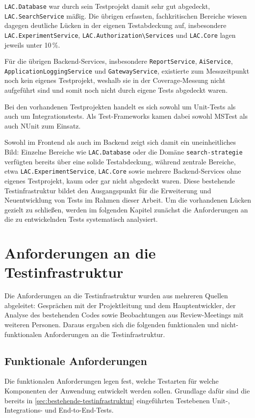 \texttt{LAC.Database} war durch sein Testprojekt damit sehr gut abgedeckt, \texttt{LAC.SearchService} mäßig. Die übrigen erfassten, fachkritischen Bereiche wiesen dagegen deutliche Lücken in der eigenen Testabdeckung auf, insbesondere \texttt{LAC.ExperimentService}, \texttt{LAC.Authorization\textbackslash Services} und \texttt{LAC.Core} lagen jeweils unter 10\,\%.

Für die übrigen Backend-Services, insbesondere \texttt{ReportService}, \texttt{AiService}, \texttt{ApplicationLoggingService} und \texttt{GatewayService}, existierte zum Messzeitpunkt noch kein eigenes Testprojekt, weshalb sie in der Coverage-Messung nicht aufgeführt sind und somit noch nicht durch eigene Tests abgedeckt waren.

Bei den vorhandenen Testprojekten handelt es sich sowohl um Unit-Tests als auch um Integrationstests. Als Test-Frameworks kamen dabei sowohl MSTest als auch NUnit zum Einsatz.

Sowohl im Frontend als auch im Backend zeigt sich damit ein uneinheitliches Bild: Einzelne Bereiche wie \texttt{LAC.Database} oder die Domäne \texttt{search-strategie} verfügten bereits über eine solide Testabdeckung, während zentrale Bereiche, etwa \texttt{LAC.ExperimentService}, \texttt{LAC.Core} sowie mehrere Backend-Services ohne eigenes Testprojekt, kaum oder gar nicht abgedeckt waren. Diese bestehende Testinfrastruktur bildet den Ausgangspunkt für die Erweiterung und Neuentwicklung von Tests im Rahmen dieser Arbeit. Um die vorhandenen Lücken gezielt zu schließen, werden im folgenden Kapitel zunächst die Anforderungen an die zu entwickelnden Tests systematisch analysiert.


\section{Anforderungen an die Testinfrastruktur}
\label{sec:anforderungen-testinfrastruktur}
Die Anforderungen an die Testinfrastruktur wurden aus mehreren Quellen abgeleitet: Gesprächen mit der Projektleitung und dem Hauptentwickler, der Analyse des bestehenden Codes sowie Beobachtungen aus Review-Meetings mit weiteren Personen. Daraus ergaben sich die folgenden funktionalen und nicht-funktionalen Anforderungen an die Testinfrastruktur.

\subsection{Funktionale Anforderungen}
Die funktionalen Anforderungen legen fest, welche Testarten für welche Komponenten der Anwendung entwickelt werden sollen. Grundlage dafür sind die bereits in \autoref{sec:bestehende-testinfrastruktur} eingeführten Testebenen Unit-, Integrations- und End-to-End-Tests.

